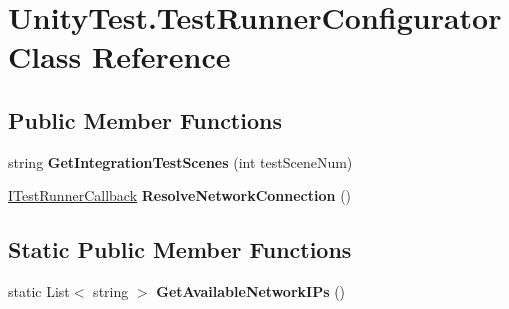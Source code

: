 \hypertarget{class_unity_test_1_1_test_runner_configurator}{}\section{Unity\+Test.\+Test\+Runner\+Configurator Class Reference}
\label{class_unity_test_1_1_test_runner_configurator}
\subsection*{Public Member Functions}
\begin{DoxyCompactItemize}
\item 
\mbox{\label{class_unity_test_1_1_test_runner_configurator_a02622dedaef5135db8caf540ed3bc608}} 
string {\bfseries Get\+Integration\+Test\+Scenes} (int test\+Scene\+Num)
\item 
\mbox{\label{class_unity_test_1_1_test_runner_configurator_ac20005122b8e54a5b4ca717c71df2433}} 
\hyperlink{interface_unity_test_1_1_integration_test_runner_1_1_i_test_runner_callback}{I\+Test\+Runner\+Callback} {\bfseries Resolve\+Network\+Connection} ()
\end{DoxyCompactItemize}
\subsection*{Static Public Member Functions}
\begin{DoxyCompactItemize}
\item 
\mbox{\label{class_unity_test_1_1_test_runner_configurator_a6b6c47c200e605a3c72f1c09efa92bef}} 
static List$<$ string $>$ {\bfseries Get\+Available\+Network\+I\+Ps} ()
\end{DoxyCompactItemize}
